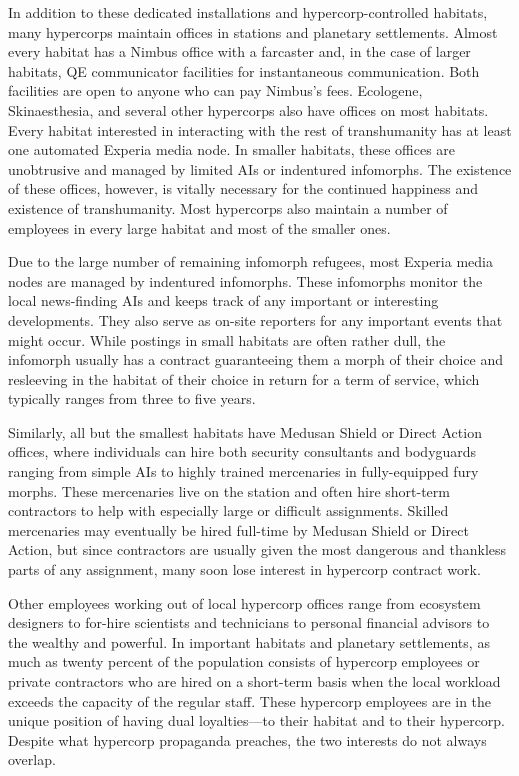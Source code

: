 In addition to these dedicated installations and hypercorp-controlled habitats, many hypercorps maintain offices in stations and planetary settlements. Almost every habitat has a Nimbus office with a farcaster and, in the case of larger habitats, QE communicator facilities for instantaneous communication. Both facilities are open to anyone who can pay Nimbus's fees. Ecologene, Skinaesthesia, and several other hypercorps also have offices on most habitats. Every habitat interested in interacting with the rest of transhumanity has at least one automated Experia media node. In smaller habitats, these offices are unobtrusive and managed by limited AIs or indentured infomorphs. The existence of these offices, however, is vitally necessary for the continued happiness and existence of transhumanity. Most hypercorps also maintain a number of employees in every large habitat and most of the smaller ones. 

Due to the large number of remaining infomorph refugees, most Experia media nodes are managed by indentured infomorphs. These infomorphs monitor the local news-finding AIs and keeps track of any important or interesting developments. They also serve as on-site reporters for any important events that might occur. While postings in small habitats are often rather dull, the infomorph usually has a contract guaranteeing them a morph of their choice and resleeving in the habitat of their choice in return for a term of service, which typically ranges from three to five years. 

Similarly, all but the smallest habitats have Medusan Shield or Direct Action offices, where individuals can hire both security consultants and bodyguards ranging from simple AIs to highly trained mercenaries in fully-equipped fury morphs. These mercenaries live on the station and often hire short-term contractors to help with especially large or difficult assignments. Skilled mercenaries may eventually be hired full-time by Medusan Shield or Direct Action, but since contractors are usually given the most dangerous and thankless parts of any assignment, many soon lose interest in hypercorp contract work. 

Other employees working out of local hypercorp offices range from ecosystem designers to for-hire scientists and technicians to personal financial advisors to the wealthy and powerful. In important habitats and planetary settlements, as much as twenty percent of the population consists of hypercorp employees or private contractors who are hired on a short-term basis when the local workload exceeds the capacity of the regular staff. These hypercorp employees are in the unique position of having dual loyalties—to their habitat and to their hypercorp. Despite what hypercorp propaganda preaches, the two interests do not always overlap. 

